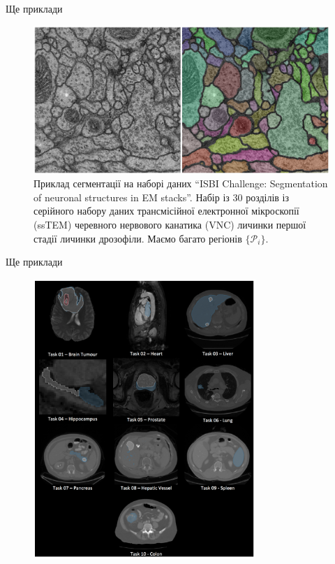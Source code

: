 \documentclass{zkdl-presentation-template}
\begin{document}
    \begin{frame}{Ще приклади}
        \begin{figure}
            \centering
            \includegraphics[width=\textwidth]{images/unet_original_dataset.png}
            \caption{Приклад сегментації на наборі даних ``ISBI Challenge: Segmentation of neuronal structures in EM stacks''. Набір із 30 розділів із серійного набору даних трансмісійної електронної мікроскопії (ssTEM) черевного нервового канатика (VNC) личинки першої стадії личинки дрозофіли. Маємо багато регіонів $\{\mathcal{P}_i\}$.}
        \end{figure}
    \end{frame}

    \begin{frame}{Ще приклади}
        \begin{figure}
            \centering
            \includegraphics[width=0.75\textwidth]{images/decathlon.png}
        \end{figure}
    \end{frame}
\end{document}
